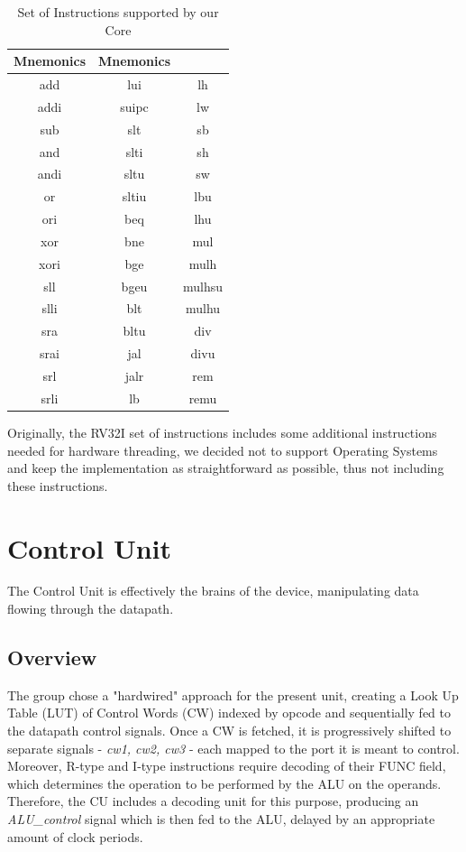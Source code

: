 \documentclass[10pt,  english, makeidx, a4paper, titlepage, oneside]{book}
\begin{document}
\begin{table}[h]
    \centering
    \begin{tabular}{|c|c|c|}
        \hline
        \textbf{Mnemonics} & \textbf{Mnemonics} \\
        \hline
        add     &   lui &  lh\\
        \hline
        addi    &   suipc&  lw\\
        \hline
        sub     &    slt&   sb\\ 
        \hline
        and     &   slti &   sh\\
        \hline
        andi    &   sltu &   sw\\ %
        \hline
        or      &   sltiu&   lbu\\
        \hline
        ori     &   beq &   lhu\\ 
        \hline
        xor     &   bne&   mul\\
        \hline
        xori    &   bge &   mulh\\
        \hline
        sll     &   bgeu&   mulhsu\\ %
        \hline
        slli    &   blt  &   mulhu\\ 
        \hline
        sra     &   bltu  &   div\\
        \hline
        srai    &   jal  &   divu\\
        \hline
        srl     &   jalr  &   rem\\
        \hline
        srli    &   lb  &   remu\\ %
        \hline


    \end{tabular}
    \caption{Set of Instructions supported by our Core}
    \label{tab:supported_instruction}
\end{table}
Originally, the RV32I set of instructions includes some additional instructions needed for hardware threading, we decided not to support Operating Systems and keep the implementation as straightforward as possible, thus not including these instructions.
\mainmatter
\chapter{Control Unit}
\label{cu}
The Control Unit is effectively the brains of the device, manipulating data flowing through the datapath.
\section{Overview}
The group chose a "hardwired" approach for the present unit, creating a Look Up Table (LUT) of Control Words (CW) indexed by opcode and sequentially fed to the datapath control signals. Once a CW is fetched, it is progressively shifted to separate signals - \textit{cw1, cw2, cw3} - each mapped to the port it is meant to control. 
\\
Moreover, R-type and I-type instructions require decoding of their FUNC field, which determines the operation to be performed by the ALU on the operands. Therefore, the CU includes a decoding unit for this purpose, producing an \textit{ALU\_control} signal which is then fed to the ALU, delayed by an appropriate amount of clock periods.
\end{document}
